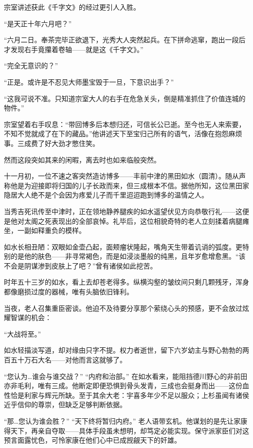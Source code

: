 \documentclass[
]{article}
\begin{document}
宗室讲述获此《千字文》的经过更引人入胜。

``是天正十年六月吧？''

``六月二日。奉茶完毕正欲退下，光秀大人突然起兵。在下拼命逃窜，跑出一段后才发现右手竟攥着卷轴------就是这《千字文》。''

``完全无意识的？''

``正是。或许是不忍见大师墨宝毁于一旦，下意识出手？''

``这我可说不准。只知道宗室大人的右手在危急关头，倒是精准抓住了价值连城的物件。''

宗室望着右手叹息：``带回博多后本想归还，可信长公已逝。至今也无人来索要，不知不觉就成了在下的藏品。''他讲述天下至宝归己所有的语气，活像在抱怨麻烦事。三成费了好大劲才憋住笑。

然而这段突如其来的闲暇，离去时也如来临般突然。

十一月初，一位不速之客突然造访博多------丰前中津的黑田如水（圆清）。随从声称他是为迎接即将归国的儿子长政而来，但三成根本不信。据他所知，这位黑田家隐居大人绝不是个会因为疼爱儿子而千里迢迢跑到博多的温情之人。

当秀吉死讯传至中津时，正在领地静养腿疾的如水遥望伏见方向恭敬行礼------这便是他对太阁之死表现出的全部哀悼。礼毕后，这位相貌奇特的老人立刻揉着病腿瘫坐，一副如释重负的模样。

如水长相丑陋：双眼如金壶凸起，面颊瘤状隆起，嘴角天生带着讥诮的弧度。更特别的是他的肤色------非寻常褐色，而是如浸淡墨般的纯黑，且年岁愈增愈黑。``该不会是阴谋渗到皮肤上了吧？''曾有诸侯如此挖苦。

时年五十三岁的如水，看上去却苍老得多。纵横沟壑的皱纹间只剩几颗残牙，浑身都像磨损过度的器械，唯有头脑依旧锋利。

当夜，老人召集重臣密谈。他迫不及待要分享那个萦绕心头的预感，更不会放过炫耀智谋的机会：

``大战将至。''

如水轻描淡写道，却对缘由只字不提。权力者逝世，留下六岁幼主与野心勃勃的两百五十万石大名------对他而言这就够了。

``您认为\ldots 谁会与谁交战？''
``内府和治部。''
在如水看来，能阻挡德川野心的非前田亦非毛利，唯有三成。他断定即便恐惧到骨头发青，三成也会挺身而出------这份血性恰是利家与辉元所缺。至于其余大老：宇喜多年少不足以服众；上杉虽闻有诸侯近乎信仰的尊崇，但缺乏足够判断依据。

``那\ldots 您认为谁会胜？''
``天下终将暂归内府。''
老人语带玄机。他谋划的是先让家康得天下，再亲自夺取------具体手段虽未想明，却笃定必能实现。保守派家臣们对这预言面露忧色，可怜家康在他们心中已成觊觎天下的奸雄。
\end{document}
